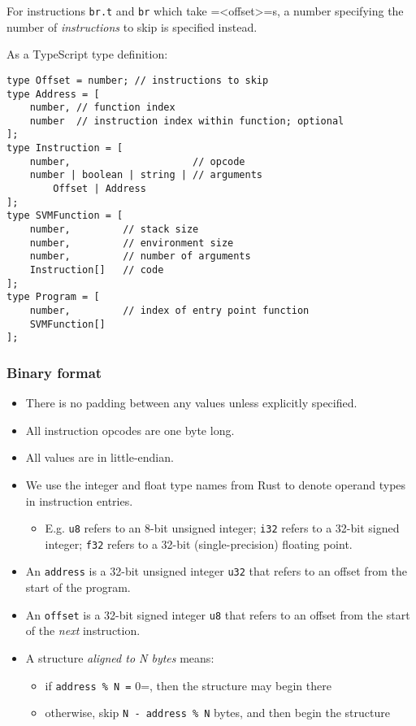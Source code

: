 For instructions \texttt{br.t} and \texttt{br} which take =<offset>=s, a number
specifying the number of \emph{instructions} to skip is specified instead.

As a TypeScript type definition:

\begin{verbatim}
type Offset = number; // instructions to skip
type Address = [
    number, // function index
    number  // instruction index within function; optional
];
type Instruction = [
    number,                     // opcode
    number | boolean | string | // arguments
        Offset | Address
];
type SVMFunction = [
    number,         // stack size
    number,         // environment size
    number,         // number of arguments
    Instruction[]   // code
];
type Program = [
    number,         // index of entry point function
    SVMFunction[]
];
\end{verbatim}

\subsubsection{Binary format}
\label{sec:orgcab67ee}
\begin{itemize}
\item There is no padding between any values unless explicitly specified.
\item All instruction opcodes are one byte long.
\item All values are in little-endian.
\item We use the integer and float type names from Rust to denote operand
types in instruction entries.

\begin{itemize}
\item E.g. \texttt{u8} refers to an 8-bit unsigned integer; \texttt{i32} refers to a
32-bit signed integer; \texttt{f32} refers to a 32-bit (single-precision)
floating point.
\end{itemize}

\item An \texttt{address} is a 32-bit unsigned integer \texttt{u32} that refers to an
offset from the start of the program.
\item An \texttt{offset} is a 32-bit signed integer \texttt{u8} that refers to an offset
from the start of the \emph{next} instruction.
\item A structure \emph{aligned to N bytes} means:

\begin{itemize}
\item if \texttt{address \% N =} 0=, then the structure may begin there
\item otherwise, skip \texttt{N - address \% N} bytes, and then begin the
structure
\end{itemize}
\end{itemize}

